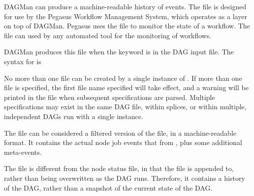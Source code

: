 DAGMan can produce a machine-readable history of events.
The  file is designed for use by the Pegasus Workflow
Management System, which operates as a layer on top of DAGMan.  Pegasus
uses the  file to monitor the state of a workflow.
The  file can used by any
automated tool for the monitoring of workflows.

DAGMan produces this file when the keyword  is
in the DAG input file.
The syntax for  is

 

No more than one  file can be created by a single
instance of .
If more than one  file is specified,
the first file name specified will take effect,
and a warning will be printed in the  file
when subsequent  specifications are parsed.
Multiple specifications may exist in the same DAG file, within splices,
or within multiple, independent DAGs run with a single  instance.

The  file can be considered a filtered
version of the  file, in a machine-readable format.
It contains the actual node job events that from ,
plus some additional meta-events.

The  file is different from the node status file,
in that the  file is appended to,
rather than being overwritten as the DAG runs.
Therefore, it contains a history of the DAG,
rather than a snapshot of the current state of the DAG.

